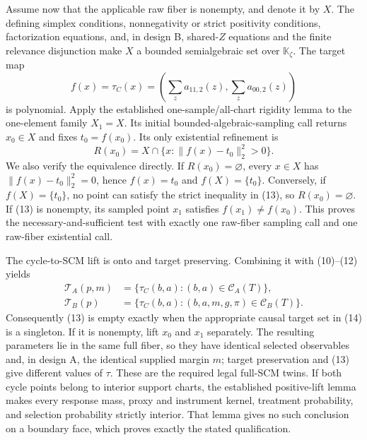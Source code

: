 Assume now that the applicable raw fiber is nonempty, and denote it by \(X\).  The defining simplex conditions, nonnegativity or strict positivity conditions, factorization equations, and, in design B, shared-\(Z\) equations and the finite relevance disjunction make \(X\) a bounded semialgebraic set over \(\mathbb K_{\zeta}\).  The target map
\[
f(x)=\tau_C(x)=
\left(\sum_z a_{11,2}(z),\sum_z a_{00,2}(z)\right)           \tag{12}
\]
is polynomial.  Apply the established one-sample/all-chart rigidity lemma to the one-element family \(X_1=X\).  Its initial bounded-algebraic-sampling call returns \(x_0\in X\) and fixes \(t_0=f(x_0)\).  Its only existential refinement is
\[
R(x_0)=X\cap\{x:\|f(x)-t_0\|_2^2>0\}.                     \tag{13}
\]
We also verify the equivalence directly.  If \(R(x_0)=\varnothing\), every \(x\in X\) has \(\|f(x)-t_0\|_2^2=0\), hence \(f(x)=t_0\) and \(f(X)=\{t_0\}\).  Conversely, if \(f(X)=\{t_0\}\), no point can satisfy the strict inequality in (13), so \(R(x_0)=\varnothing\).  If (13) is nonempty, its sampled point \(x_1\) satisfies \(f(x_1)\neq f(x_0)\).  This proves the necessary-and-sufficient test with exactly one raw-fiber sampling call and one raw-fiber existential call.

The cycle-to-SCM lift is onto and target preserving.  Combining it with (10)--(12) yields
\[
\begin{aligned}
\mathcal T_A(p,m)
 &=\{\tau_C(b,a):(b,a)\in\mathcal C_A(T)\},\\
\mathcal T_B(p)
 &=\{\tau_C(b,a):(b,a,m,g,\pi)\in\mathcal C_B(T)\}.
\end{aligned}                                                \tag{14}
\]
Consequently (13) is empty exactly when the appropriate causal target set in (14) is a singleton.  If it is nonempty, lift \(x_0\) and \(x_1\) separately.  The resulting parameters lie in the same full fiber, so they have identical selected observables and, in design A, the identical supplied margin \(m\); target preservation and (13) give different values of \(\tau\).  These are the required legal full-SCM twins.  If both cycle points belong to interior support charts, the established positive-lift lemma makes every response mass, proxy and instrument kernel, treatment probability, and selection probability strictly interior.  That lemma gives no such conclusion on a boundary face, which proves exactly the stated qualification.


